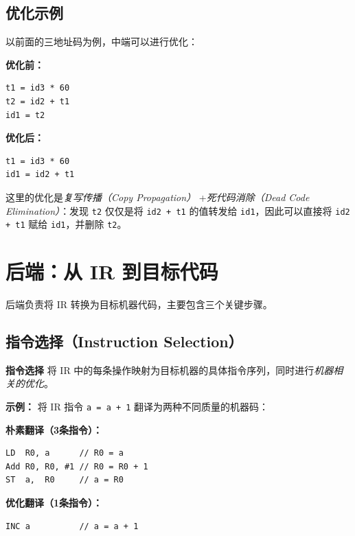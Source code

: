 \documentclass[12pt,a4paper]{ctexart}
\newcommand{\term}[1]{\textbf{\textcolor{mainblue}{#1}}}
\begin{document}
\subsection{优化示例}

以前面的三地址码为例，中端可以进行优化：

\begin{minipage}{0.48\textwidth}
\textbf{优化前：}
\begin{lstlisting}
t1 = id3 * 60
t2 = id2 + t1
id1 = t2
\end{lstlisting}
\end{minipage}
\hfill
\begin{minipage}{0.48\textwidth}
\textbf{优化后：}
\begin{lstlisting}
t1 = id3 * 60
id1 = id2 + t1
\end{lstlisting}
\end{minipage}

\vspace{0.3em}
这里的优化是\emph{复写传播（Copy Propagation）} +\emph{死代码消除（Dead Code Elimination）}：发现 \texttt{t2} 仅仅是将 \texttt{id2 + t1} 的值转发给 \texttt{id1}，因此可以直接将 \texttt{id2 + t1} 赋给 \texttt{id1}，并删除 \texttt{t2}。

\newpage

\section{后端：从 IR 到目标代码}

后端负责将 IR 转换为目标机器代码，主要包含三个关键步骤。

\subsection{指令选择（Instruction Selection）}

\begin{keybox}
  \term{指令选择} 将 IR 中的每条操作映射为目标机器的具体指令序列，同时进行\emph{机器相关的优化}。
\end{keybox}

\textbf{示例：} 将 IR 指令 \texttt{a = a + 1} 翻译为两种不同质量的机器码：

\begin{minipage}{0.48\textwidth}
\textbf{朴素翻译（3条指令）：}
\begin{lstlisting}
LD  R0, a      // R0 = a
Add R0, R0, #1 // R0 = R0 + 1
ST  a,  R0     // a = R0
\end{lstlisting}
\end{minipage}
\hfill
\begin{minipage}{0.48\textwidth}
\textbf{优化翻译（1条指令）：}
\begin{lstlisting}
INC a          // a = a + 1
\end{lstlisting}
\end{minipage}
\end{document}
